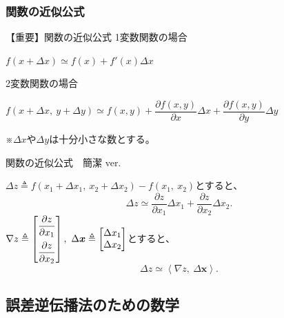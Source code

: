 \documentclass[dvipdfmx,aspectratio=169]{beamer}
\begin{document}
	\subsubsection{関数の近似公式}
	\begin{frame}{【重要】関数の近似公式}
		1変数関数の場合
		\begin{screen}
			$ f(x+\Delta x) \simeq f(x) + f'(x)\Delta x $
		\end{screen}
		2変数関数の場合
		\begin{screen}
			$ f(x+\Delta x,\ y+\Delta y) \simeq f(x,y) + \dfrac{\partial f(x,y)}{\partial x}\Delta x + \dfrac{\partial f(x,y)}{\partial y}\Delta y $
		\end{screen}
		※$ \Delta x $や$ \Delta y $は十分小さな数とする。
	\end{frame}
	\begin{frame}{関数の近似公式　簡潔 ver.}
		\begin{screen}
			$ \Delta z \triangleq f(x_1+\Delta x_1,\ x_2+\Delta x_2) - f(x_1,\ x_2) $とすると、
			\begin{equation*}
				\Delta z \simeq \dfrac{\partial z}{\partial x_1} \Delta x_1 + \dfrac{\partial z}{\partial x_2} \Delta x_2.
			\end{equation*}
			$ \nabla z \triangleq \begin{bmatrix}
				\dfrac{\partial z}{\partial x_1}\vspace{0.5em}\\
				\dfrac{\partial z}{\partial x_2}
			\end{bmatrix},\ \Delta \boldsymbol{x} \triangleq \begin{bmatrix}
				\Delta x_1\\
				\Delta x_2
			\end{bmatrix} $とすると、
			\begin{equation*}
				\Delta z \simeq \left\langle \nabla z,\ \Delta \boldsymbol{x} \right\rangle.
			\end{equation*}
		\end{screen}
	\end{frame}
	
	\subsection{誤差逆伝播法のための数学}
\end{document}
